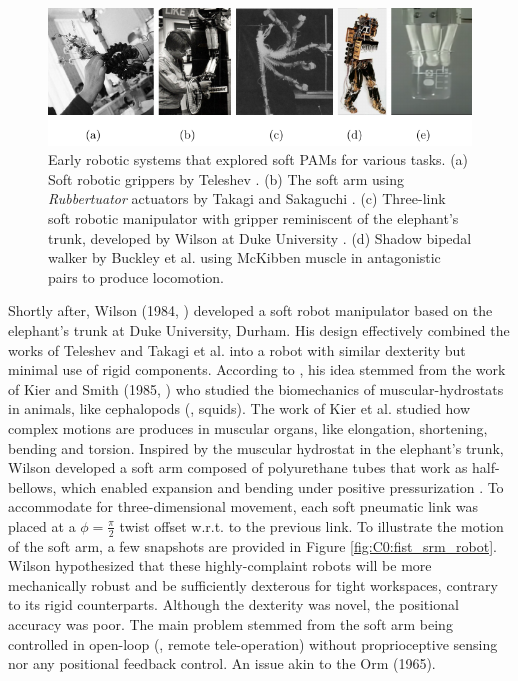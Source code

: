 \begin{figure}[!t]
  \includegraphics*[width=\textwidth]{./pdf/thesis-figure-2-5.pdf}
  \vspace{-2mm}
  \caption{Early robotic systems that explored soft PAMs for various tasks. (a) Soft robotic grippers by Teleshev \cite{Teleshev1981}. (b) The soft arm using \textit{Rubbertuator} actuators by Takagi and Sakaguchi \cite{Takagi1983}. (c) Three-link soft robotic manipulator with gripper reminiscent of the elephant's trunk, developed by Wilson at Duke University \cite{Wilson2007,Weisburd1988}. (d) Shadow bipedal walker by Buckley et al. \cite{Buckley2012} using McKibben muscle in antagonistic pairs to produce locomotion.
  \label{fig:C0:earlyPAMrobots}}
  \vspace{-2mm}
\end{figure}
%
\par Shortly after, Wilson (1984, \cite{Wilson2007}) developed a soft robot manipulator based on the elephant's trunk at Duke University, Durham. His design effectively combined the works of Teleshev \cite{Teleshev1981} and Takagi et al. \cite{Takagi1983} into a robot with similar dexterity but minimal use of rigid components. According to \cite{Weisburd1988}, his idea stemmed from the work of Kier and Smith (1985, \cite{Kier1985}) who studied the biomechanics of muscular-hydrostats in animals, like cephalopods (\eg, squids). The work of Kier et al. \cite{Kier1985} studied how complex motions are produces in muscular organs, like elongation, shortening, bending and torsion. Inspired by the muscular hydrostat in the elephant's trunk, Wilson developed a soft arm composed of polyurethane tubes that work as half-bellows, which enabled expansion and bending under positive pressurization \cite{Weisburd1988}. To accommodate for three-dimensional movement, each soft pneumatic link was placed at a $ \phi = \frac{\pi}{2}$ twist offset w.r.t. to the previous link. To illustrate the motion of the soft arm, a few snapshots are provided in Figure \ref{fig:C0:fist_srm_robot}. Wilson hypothesized that these highly-complaint robots will be more mechanically robust and be sufficiently dexterous for tight workspaces, contrary to its rigid counterparts. Although the dexterity was novel, the positional accuracy was poor. The main problem stemmed from the soft arm being controlled in open-loop (\ie, remote tele-operation) without proprioceptive sensing nor any positional feedback control. An issue akin to the Orm (1965). 

